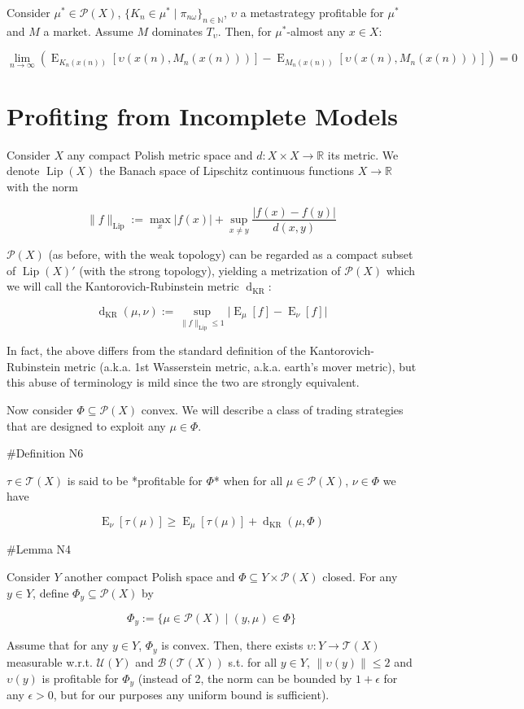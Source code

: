 \documentclass[a4paper]{article}
\DeclareMathOperator{\E}{E}
\newcommand{\Nats}{\mathbb{N}}
\newcommand{\Reals}{\mathbb{R}}
\newcommand{\Abs}[1]{\lvert #1 \rvert}
\newcommand{\Norm}[1]{\lVert #1 \rVert}
\newcommand{\Prob}{\mathcal{P}}
\newcommand{\T}{\mathcal{T}}
\newcommand{\B}{\mathcal{B}}
\newcommand{\UM}{\mathcal{U}}
\newcommand{\Lip}{\operatorname{Lip}}
\newcommand{\NormL}[1]{\Norm{#1}_{\operatorname{Lip}}}
\newcommand{\Dkr}{\operatorname{d}_{\text{KR}}}
\begin{document}
Consider ${\mu^* \in \Prob(X)}$, ${\{K_n \in \mu^* \mid \pi_{n\omega}\}_{n \in \Nats}}$, ${\upsilon}$ a metastrategy profitable for ${\mu^*}$ and ${M}$ a market. Assume ${M}$ dominates ${T_\upsilon}$. Then, for ${\mu^*}$-almost any ${x \in X}$:

$$\lim_{n \rightarrow \infty} (\E_{K_n(x(n))}[\upsilon(x(n),M_n(x(n)))]-\E_{M_n(x(n))}[\upsilon(x(n),M_n(x(n)))])= 0$$

\section{Profiting from Incomplete Models}

Consider ${X}$ any compact Polish metric space and ${d: X \times X \rightarrow \Reals}$ its metric. We denote ${\Lip(X)}$ the Banach space of Lipschitz continuous functions ${X \rightarrow \Reals}$ with the norm

$$\NormL{f}:=\max_{x} \Abs{f(x)} + \sup_{x \ne y}\frac{\Abs{f(x)-f(y)}}{d(x,y)}$$

${\Prob(X)}$ (as before, with the weak topology) can be regarded as a compact subset of ${\Lip(X)'}$ (with the strong topology), yielding a metrization of ${\Prob(X)}$ which we will call the Kantorovich-Rubinstein metric ${\Dkr}$:

$$\Dkr(\mu,\nu):=\sup_{\NormL{f} \leq 1} \Abs{\E_\mu[f] - \E_\nu[f]}$$

In fact, the above differs from the standard definition of the Kantorovich-Rubinstein metric (a.k.a. 1st Wasserstein metric, a.k.a. earth's mover metric), but this abuse of terminology is mild since the two are strongly equivalent.

Now consider ${\Phi \subseteq \Prob(X)}$ convex. We will describe a class of trading strategies that are designed to exploit any ${\mu \in \Phi}$.

\#Definition N6

${\tau \in \T(X)}$ is said to be *profitable for ${\Phi}$* when for all ${\mu \in \Prob(X)}$, ${\nu \in \Phi}$ we have

$$\E_\nu[\tau(\mu)] \geq \E_\mu[\tau(\mu)] + \Dkr(\mu,\Phi)$$

\#Lemma N4

Consider ${Y}$ another compact Polish space and ${\Phi \subseteq Y \times \Prob(X)}$ closed. For any ${y \in Y}$, define ${\Phi_y \subseteq \Prob(X)}$ by

$${\Phi_y := \{\mu \in \Prob(X) \mid (y,\mu) \in \Phi\}}$$ 

Assume that for any ${y \in Y}$, ${\Phi_y}$ is convex. Then, there exists ${\upsilon: Y \rightarrow \T(X)}$ measurable w.r.t. ${\UM(Y)}$ and ${\B(\T(X))}$ s.t. for all ${y \in Y}$, ${\Norm{\upsilon(y)} \leq 2}$ and ${\upsilon(y)}$ is profitable for ${\Phi_y}$ (instead of 2, the norm can be bounded by ${1+\epsilon}$ for any ${\epsilon > 0}$, but for our purposes any uniform bound is sufficient).
\end{document}
